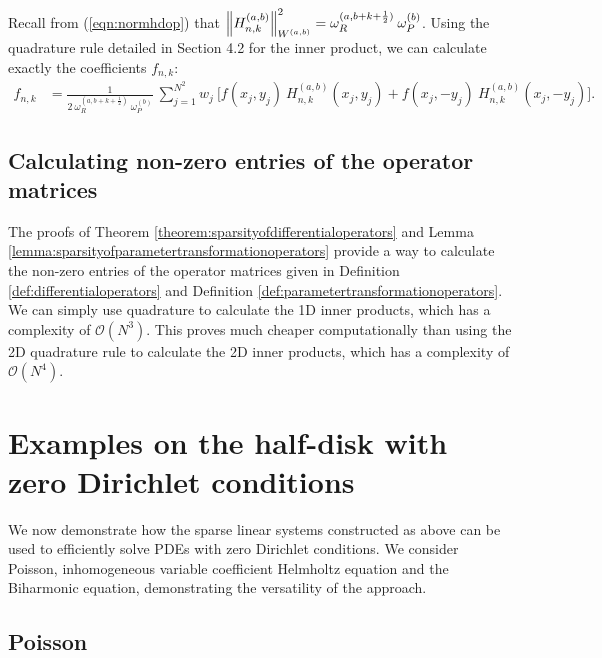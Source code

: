 \documentclass[11pt, oneside]{article}   	%
\newcommand{\bigO}{\mathcal{O}}
\newcommand{\half}{\frac{1}{2}}
\newcommand{\hdop}{H}
\newcommand{\hdopnk}{\hdop_{n,k}}
\newcommand{\hdopnkab}{\hdop_{n,k}^{(a,b)}}
\newcommand{\Wab}{{W^{(a,b)}}}
\newcommand{\genjac}{R}
\newcommand{\normgenjac}{\omega_\genjac}
\newcommand{\normjac}{\omega_P}
\begin{document}
Recall from (\ref{eqn:normhdop}) that $\norm{\hdopnkab}^2_\Wab = \normgenjac^{(a,b+k+\half)} \: \normjac^{(b)}$. Using the quadrature rule detailed in Section 4.2 for the inner product, we can calculate exactly the coefficients $f_{n,k}$: 
\begin{align*}
	f_{n,k} &= \frac{1}{2 \: \normgenjac^{(a,b+k+\half)} \: \normjac^{(b)}} \: \sum_{j=1}^{N^2} w_j \: \big[ f(x_j, y_j) \: \hdopnk^{(a,b)}(x_j, y_j) +f(x_j, -y_j) \: \hdopnk^{(a,b)}(x_j, -y_j) \big].
\end{align*}


\subsection{Calculating non-zero entries of the operator matrices}\label{subsection:Computation-operatormatrices}

The proofs of Theorem \ref{theorem:sparsityofdifferentialoperators} and Lemma \ref{lemma:sparsityofparametertransformationoperators} provide a way to calculate the non-zero entries of the operator matrices given in Definition \ref{def:differentialoperators} and Definition \ref{def:parametertransformationoperators}. We can simply use quadrature to calculate the 1D inner products, which has a complexity of $\bigO(N^3)$. This proves much cheaper computationally than using the 2D quadrature rule to calculate the 2D inner products, which has a complexity of $\bigO(N^4)$. 


%
\section{Examples on the half-disk with zero Dirichlet conditions}\label{Section:Examples}

We now demonstrate how the sparse linear systems constructed as above can be used to efficiently solve PDEs with zero Dirichlet conditions. We consider Poisson, inhomogeneous variable coefficient Helmholtz equation and the Biharmonic equation, demonstrating the versatility of the approach. 

\subsection{Poisson}
\end{document}

